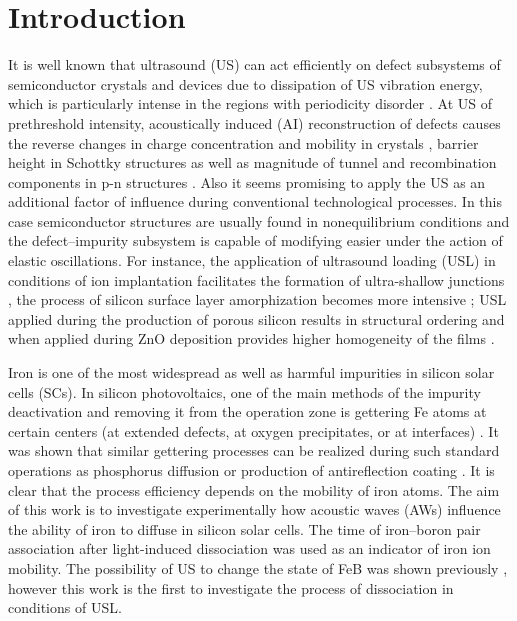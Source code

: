 \documentclass[sn-mathphys]{sn-jnl}%
\theoremstyle{thmstyleone}%
\theoremstyle{thmstyletwo}%
\theoremstyle{thmstylethree}%
\begin{document}
\section{Introduction}\label{sec1}

It is well known that ultrasound (US) can act efficiently on defect subsystems of semiconductor crystals and devices due to dissipation of US vibration energy, which is particularly intense in the regions with periodicity disorder \cite{ostapenko2002,Savkina2013,Olikh2018JAP}.
At US of prethreshold intensity, acoustically induced (AI) reconstruction of defects causes the reverse changes in charge concentration and mobility in crystals \cite{Davletova2008,Olikh2020JEM},
barrier height in Schottky structures \cite{Olikh:Ultras,OlikhJAP}
as well as magnitude of tunnel and recombination components in p-n structures \cite{Teterkin2009,Olikh2018JAP}.
Also it seems promising to apply the US as an additional factor of influence during conventional technological processes.
In this case semiconductor structures are usually found in  nonequilibrium conditions and the defect--impurity subsystem is capable of modifying easier under the action of elastic oscillations.
For instance, the application of ultrasound loading (USL) in conditions of ion implantation facilitates
the formation of ultra-shallow junctions \cite{USImplant:JVacSci},
the process of silicon surface layer amorphization becomes more intensive \cite{RomanyukSST};
USL applied during the production of porous silicon  results in structural ordering \cite{Kalem2000}
and when applied during ZnO deposition provides higher homogeneity of the films \cite{US:ZnOfilm}.

Iron is one of the most widespread as well as harmful impurities in silicon solar cells (SCs).
In silicon photovoltaics, one of the main methods of the impurity deactivation and removing it from the operation zone is gettering Fe atoms at certain centers (at extended defects, at oxygen precipitates, or at interfaces) \cite{LaineIEEEPV2016}.
It was shown that similar gettering processes can be realized during such standard operations as phosphorus diffusion  \cite{FeB:Vahanissi}
or production of antireflection coating  \cite{Teimuraz2014JAP}.
It is clear that the process efficiency depends on the mobility of iron atoms.
The aim of this work is to investigate experimentally how acoustic waves (AWs) influence the ability of iron to diffuse in silicon solar cells.
The time of iron--boron pair association after  light-induced dissociation was used as an indicator of iron ion mobility.
The possibility of US to change the state of FeB was shown previously  \cite{Ostapenko1995},
however this work is the first to investigate the process of dissociation in conditions of USL.
\end{document}
